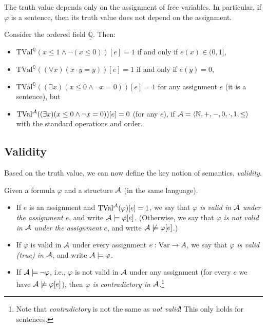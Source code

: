 \begin{remark}
    The truth value depends only on the assignment of free variables. In particular, if $\varphi$ is a sentence, then its truth value does not depend on the assignment.
\end{remark}

\begin{example}
Consider the ordered field $\underline{\mathbb Q}$. Then:
\begin{itemize}
    \item $\mathrm{TVal}^{\underline{\mathbb Q}}(x\leq 1 \land \neg (x\leq 0))[e]=1$ if and only if $e(x)\in (0,1]$,
    \item $\mathrm{TVal}^{\underline{\mathbb Q}}((\forall x)(x\cdot y = y))[e]=1$ if and only if $e(y)=0$,
    \item $\mathrm{TVal}^{\underline{\mathbb Q}}((\exists x)(x \leq 0 \land \neg x=0))[e]=1$ for any assignment $e$ (it is a sentence), but 
    \item $\mathrm{TVal}^{\mathcal{A}}((\exists x)(x \leq 0 \land \neg x=0))[e]=0$ (for any $e$), if $\mathcal{A}=\langle \mathbb N,+,-,0,\cdot,1,\leq\rangle$ with the standard operations and order.
\end{itemize}    
\end{example}

\subsection{Validity}

Based on the truth value, we can now define the key notion of semantics, \emph{validity}.

\begin{definition}
Given a formula $\varphi$ and a structure $\mathcal{A}$ (in the same language). 
\begin{itemize}
    \item If $e$ is an assignment and $\mathrm{TVal}^{\mathcal{A}}(\varphi)[e]=1$, we say that \emph{$\varphi$ is valid in $\mathcal{A}$ under the assignment $e$}, and write $\mathcal{A}\models\varphi[e]$. (Otherwise, we say that \emph{$\varphi$ is not valid in $\mathcal{A}$ under the assignment $e$}, and write $\mathcal{A}\not\models\varphi[e]$.)
    \item If $\varphi$ is valid in $\mathcal{A}$ under every assignment $e:\operatorname{Var}\to A$, we say that \emph{$\varphi$ is valid (true) in $\mathcal{A}$}, and write $\mathcal{A}\models\varphi$.
    \item If $\mathcal{A}\models\neg\varphi$, i.e., $\varphi$ is not valid in $\mathcal{A}$ under any assignment (for every $e$ we have $\mathcal{A}\not\models\varphi[e]$), then \emph{$\varphi$ is contradictory in $\mathcal{A}$}.\footnote{Note that \emph{contradictory} is not the same as \emph{not valid}! This only holds for sentences.}
\end{itemize}    
\end{definition}

